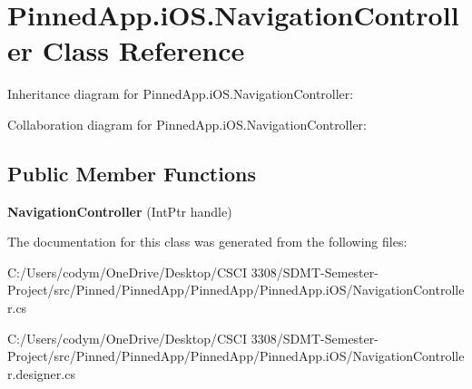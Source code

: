 \hypertarget{class_pinned_app_1_1i_o_s_1_1_navigation_controller}{}\section{Pinned\+App.\+i\+O\+S.\+Navigation\+Controller Class Reference}
\label{class_pinned_app_1_1i_o_s_1_1_navigation_controller}


Inheritance diagram for Pinned\+App.\+i\+O\+S.\+Navigation\+Controller\+:


Collaboration diagram for Pinned\+App.\+i\+O\+S.\+Navigation\+Controller\+:
\subsection*{Public Member Functions}
\begin{DoxyCompactItemize}
\item 
\mbox{\label{class_pinned_app_1_1i_o_s_1_1_navigation_controller_aee0dafaef016e6eacbb0c13daed318c1}} 
{\bfseries Navigation\+Controller} (Int\+Ptr handle)
\end{DoxyCompactItemize}


The documentation for this class was generated from the following files\+:\begin{DoxyCompactItemize}
\item 
C\+:/\+Users/codym/\+One\+Drive/\+Desktop/\+C\+S\+C\+I 3308/\+S\+D\+M\+T-\/\+Semester-\/\+Project/src/\+Pinned/\+Pinned\+App/\+Pinned\+App/\+Pinned\+App.\+i\+O\+S/Navigation\+Controller.\+cs\item 
C\+:/\+Users/codym/\+One\+Drive/\+Desktop/\+C\+S\+C\+I 3308/\+S\+D\+M\+T-\/\+Semester-\/\+Project/src/\+Pinned/\+Pinned\+App/\+Pinned\+App/\+Pinned\+App.\+i\+O\+S/Navigation\+Controller.\+designer.\+cs\end{DoxyCompactItemize}
